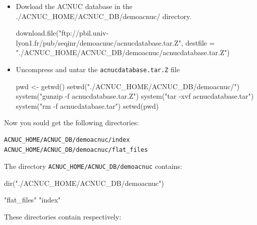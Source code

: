 \documentclass{article}
\begin{document}
\begin{itemize}
\item Dowload the ACNUC database in the ./ACNUC\_HOME/ACNUC\_DB/demoacnuc/ directory.

\begin{Schunk}
\begin{Sinput}
 download.file("ftp://pbil.univ-lyon1.fr/pub/seqinr/demoacnuc/acnucdatabase.tar.Z", 
     destfile = "./ACNUC_HOME/ACNUC_DB/demoacnuc/acnucdatabase.tar.Z")
\end{Sinput}
\end{Schunk}


\item Uncompress and untar the \texttt{acnucdatabase.tar.Z} file 

\begin{Schunk}
\begin{Sinput}
 pwd <- getwd()
 setwd("./ACNUC_HOME/ACNUC_DB/demoacnuc/")
 system("gunzip -f acnucdatabase.tar.Z")
 system("tar -xvf acnucdatabase.tar")
 system("rm -f acnucdatabase.tar")
 setwd(pwd)
\end{Sinput}
\end{Schunk}

\end{itemize}
Now you sould get the following directories:
\begin{verbatim}
ACNUC_HOME/ACNUC_DB/demoacnuc/index
ACNUC_HOME/ACNUC_DB/demoacnuc/flat_files
\end{verbatim}

The directory \texttt{ACNUC\_HOME/ACNUC\_DB/demoacnuc} contains: 
\begin{Schunk}
\begin{Sinput}
 dir("./ACNUC_HOME/ACNUC_DB/demoacnuc")
\end{Sinput}
\begin{Soutput}
[1] "flat_files" "index"     
\end{Soutput}
\end{Schunk}

These directories contain respectively:
\end{document}
